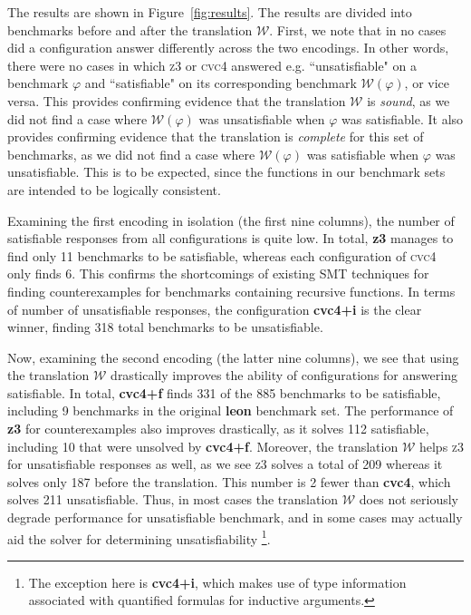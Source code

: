 \documentclass[runningheads,a4paper]{llncs}
\newcommand{\cvc}{\textsc{cvc}{\small 4}\xspace}
\newcommand{\ziii}{\textsc{z}{\small 3}\xspace}
\newcommand{\conv}{\mathcal{W}}
\begin{document}
The results are shown in Figure~\ref{fig:results}.
The results are divided into benchmarks before and after the translation $\conv$.
First, we note that in no cases did a configuration answer differently across the two encodings.
In other words, there were no cases in which \ziii or \cvc answered e.g. ``unsatisfiable" on a benchmark $\varphi$
and ``satisfiable" on its corresponding benchmark $\conv( \varphi )$, or vice versa.
This provides confirming evidence that the translation $\conv$ is \emph{sound},
as we did not find a case where $\conv( \varphi )$ was unsatisfiable when $\varphi$ was satisfiable.
It also provides confirming evidence that the translation is \emph{complete} for this set of benchmarks,
as we did not find a case where $\conv( \varphi )$ was satisfiable when $\varphi$ was unsatisfiable.
This is to be expected, since the functions in our benchmark sets are intended to be logically consistent.

Examining the first encoding in isolation (the first nine columns),
the number of satisfiable responses from all configurations is quite low.
In total, {\bf z3} manages to find only 11 benchmarks to be satisfiable,
whereas each configuration of \cvc only finds 6.
This confirms the shortcomings of existing SMT techniques for finding counterexamples for benchmarks containing recursive functions.
In terms of number of unsatisfiable responses,
the configuration {\bf cvc4+i} is the clear winner, finding 318 total benchmarks to be unsatisfiable.

Now, examining the second encoding (the latter nine columns), 
we see that using the translation $\conv$ drastically improves the ability of configurations for answering satisfiable.
In total, {\bf cvc4+f} finds 331 of the 885 benchmarks to be satisfiable, including 9 benchmarks in the original {\bf leon} benchmark set.
The performance of {\bf z3} for counterexamples also improves drastically, as it solves 112 satisfiable,
including 10 that were unsolved by {\bf cvc4+f}.
Moreover, the translation $\conv$ helps \ziii for unsatisfiable responses as well,
as we see \ziii solves a total of 209 whereas it solves only 187 before the translation.
This number is 2 fewer than {\bf cvc4}, which solves 211 unsatisfiable.
Thus, in most cases the translation $\conv$ does not seriously degrade performance for unsatisfiable benchmark,
and in some cases may actually aid the solver for determining unsatisfiability
\footnote{The exception here is {\bf cvc4+i}, which makes use of type information associated with quantified formulas for inductive arguments.}.
\end{document}

